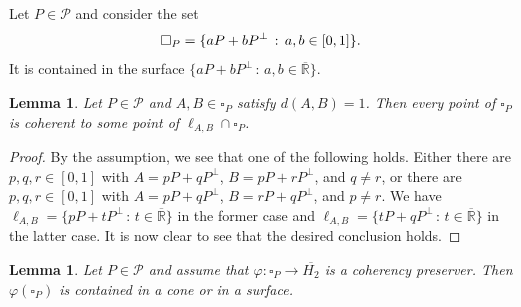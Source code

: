 \documentclass[10pt]{amsart}
\newtheorem{lemma}[theorem]{Lemma}
\theoremstyle{definition}
\theoremstyle{remark}
\numberwithin{subsection}{section}
\numberwithin{equation}{section}
\newcommand\oH{{\overline{H_2}}}
\newcommand\oR{{\overline{\mathbb{R}}}}
\begin{document}
Let $P \in \mathcal{P}$ and consider the set
\begin{equation}\label{sp}\index{$\square_P$}
{\square}_P = \{ a P + b P^\perp \, : \, a,b \in [0,1] \}.
\end{equation}
It is contained in the surface $\{ a P + b P^\perp \, : \, a,b \in {\oR} \}$.


\begin{lemma}\label{segment}
Let $P \in \mathcal{P}$ and $A, B\in {\square}_P$ satisfy $d(A, B)=1$. 
Then every point of ${\square}_P$ is coherent to some point of $\ell_{A, B} \cap {\square}_P$. 
\end{lemma}
\begin{proof}
By the assumption, we see that one of the following holds. 
Either there are $p,q,r\in [0,1]$ with $A=pP+qP^\perp$, $B=pP+rP^\perp$, and $q\neq r$, or there are $p,q,r\in [0,1]$ with $A=pP+qP^\perp$, $B=rP+qP^\perp$, and $p\neq r$. 
We have $\ell_{A, B}=\{pP+tP^\perp\,:\, t\in {\oR}\}$ in the former case and $\ell_{A, B}=\{tP+qP^\perp\,:\, t\in {\oR}\}$ in the latter case. 
It is now clear to see that the desired conclusion holds.
\end{proof}



\begin{lemma}\label{where}
Let $P \in \mathcal{P}$ and assume that $\varphi \colon {\square}_P \to \oH$ is a coherency preserver. Then $\varphi ({\square}_P)$ is contained in a cone or in a surface.
\end{lemma}
\end{document}
